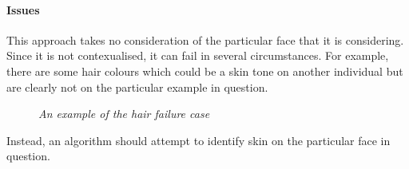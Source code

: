 \paragraph{Issues}
This approach takes no consideration of the particular face that it is considering. Since it is not contexualised, it can fail in several circumstances.
For example, there are some hair colours which could be a skin tone on another individual but are clearly not on the particular example in question.
\begin{figure}[H]
    \centering
    \qquad
   \caption{\textit{An example of the hair failure case}}
\end{figure}
Instead, an algorithm should attempt to identify skin on the particular face in question.

